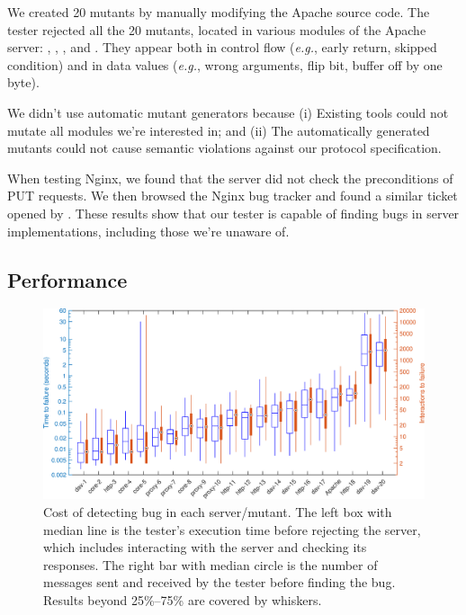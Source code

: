 We created 20 mutants by manually modifying the Apache source code.  The tester
rejected all the 20 mutants, located in various modules of the Apache server:
, , , and .  They appear
both in control flow ({\it e.g.}, early return, skipped condition) and in data
values ({\it e.g.}, wrong arguments, flip bit, buffer off by one byte).

We didn't use automatic mutant generators because (i) Existing tools could not
mutate all modules we're interested in; and (ii) The automatically generated
mutants could not cause semantic violations against our protocol specification.

When testing Nginx, we found that the server did not check the preconditions of
PUT requests.  We then browsed the Nginx bug tracker and found a similar ticket
opened by \citet{nginx242}.  These results show that our tester is capable of
finding bugs in server implementations, including those we're unaware of.

\subsection{Performance}

\begin{figure}
  \includegraphics[width=\textwidth]{figures/http-time}
  \caption{Cost of detecting bug in each server/mutant.  The left box with
    median line is the tester's execution time before rejecting the server,
    which includes interacting with the server and checking its responses.  The
    right bar with median circle is the number of \http messages sent and
    received by the tester before finding the bug.  Results beyond
    25\%--75\% are covered by whiskers.
  }
  \label{fig:checker-performance}
\end{figure}

